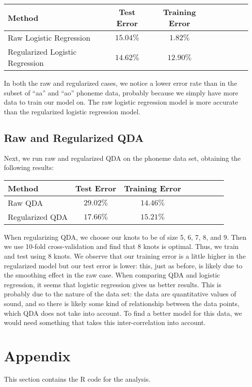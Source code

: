 \documentclass[a4paper,10pt]{article}
\begin{document}
\begin{tabular}{l*{6}{c}r}
  \hline
 Method		& Test Error & Training Error \\
 \hline
 Raw Logistic Regression		& $15.04\%$ & $1.82\%$ \\
 Regularized Logistic Regression 	& $14.62\%$ & $12.90\%$ \\
 \hline
\end{tabular}

In both the raw and regularized cases, we notice a lower error rate than 
in the subset of ``aa'' and ``ao'' phoneme data, probably because we
simply have more data to train our model on. The raw logistic regression
model is more accurate than the regularized logistic regression model.

\subsection{Raw and Regularized QDA}

Next, we run raw and regularized QDA on the phoneme data set, obtaining
the following results:

\begin{tabular}{l*{6}{c}r}
  \hline
 Method		& Test Error & Training Error \\
 \hline
 Raw QDA		& $29.02\%$ & $14.46\%$ \\
 Regularized QDA	 & $17.66\%$ & $15.21\%$ \\
 \hline
\end{tabular}

When regularizing QDA, we choose our knots to be of size 5, 6, 7, 8, and 9.
Then we use 10-fold cross-validation and find that 8 knots is optimal. Thus,
we train and test using 8 knots. We observe that our training error is a 
little higher in the regularized model but our test error is lower: this,
just as before, is likely due to the smoothing effect in the raw case.
When comparing QDA and logistic regression, it seems that logistic regression
gives us better results. This is probably due to the nature of the data set:
the data are quantitative values of sound, and so there is likely some kind
of relationship between the data points, which QDA does not take into account.
To find a better model for this data, we would need something that 
takes this inter-correlation into account.

\section{Appendix}
This section contains the R code for the analysis.
\end{document}
